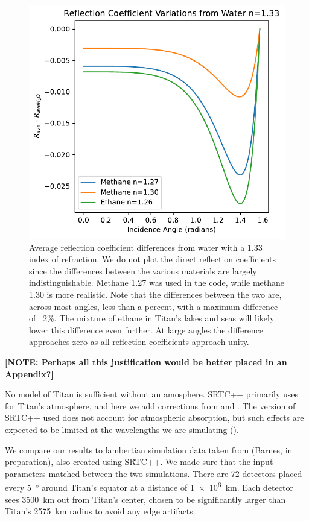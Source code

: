 \documentclass[linenumbers]{aastex631}
\begin{document}
\begin{figure}[htbp]
\includegraphics[scale = 0.5]{ReflectionVariations.pdf}
\centering
\caption{Average reflection coefficient differences from water with a 1.33 index of refraction. We do not plot the direct reflection coefficients since the differences between the various materials are largely indistinguishable. Methane 1.27 was used in the code, while methane 1.30 is more realistic. Note that the differences between the two are, across most angles, less than a percent, with a maximum difference of ~2\%. The mixture of ethane in Titan's lakes and seas will likely lower this difference even further. At large angles the difference approaches zero as all reflection coefficients approach unity.}
\label{fig:4}
\end{figure}

\textbf{\color{red} [NOTE: Perhaps all this justification would be better placed in an Appendix?] \color{black}}

No model of Titan is sufficient without an amosphere. SRTC++ primarily uses \cite{Tomasko2008} for Titan's atmosphere, and here we add corrections from \cite{Hirtzig2013} and \cite{Rodriguez2018}. The version of SRTC++ used does not account for atmospheric absorption, but such effects are expected to be limited at the wavelengths we are simulating (\cite{EsSayeh2023}).

We compare our results to lambertian simulation data taken from (Barnes, in preparation), also created using SRTC++. We made sure that the input parameters matched between the two simulations. There are 72 detectors placed every \qty{5}{\degree} around Titan's equator at a distance of \qty{1e6}{\kilo\meter}. Each detector sees \qty{3500}{\kilo\meter} out from Titan's center, chosen to be significantly larger than Titan's \qty{2575}{\kilo\meter} radius to avoid any edge artifacts. 
\end{document}
